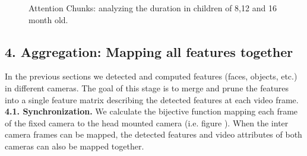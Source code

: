 \documentclass[10pt,letterpaper]{article}
\begin{document}
\begin{figure}[h]
\begin{center}
\caption{Attention Chunks: analyzing the duration in children of 8,12 and 16 month old.}
\label{fig:subfigures}
\end{center}
\end{figure}
\subsection{4. Aggregation: Mapping all features together}
In the previous sections we detected and computed features (faces, objects, etc.) in different cameras. The goal of this stage is to merge and prune the features into a single feature matrix describing the detected features at each video frame.\\

{\bf 4.1. Synchronization.} We calculate the bijective function mapping each frame of the fixed camera to the head mounted camera (i.e. figure \label{fig:main} ). When the inter camera frames can be mapped, the detected features and video attributes of both cameras can also be mapped together.\\
\end{document}
